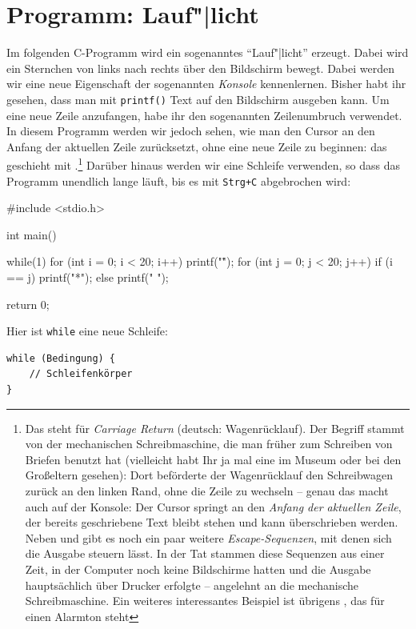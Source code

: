 \section{Programm: Lauf"|licht}
\label{sec:c:lauflicht}

Im folgenden C-Programm wird ein sogenanntes ``Lauf"|licht'' erzeugt. Dabei wird ein Sternchen von links nach rechts über den Bildschirm bewegt. 
Dabei werden wir eine neue Eigenschaft der sogenannten \emph{Konsole} kennenlernen. Bisher habt ihr gesehen, dass man mit \texttt{printf()} Text auf den Bildschirm ausgeben kann. Um eine neue Zeile anzufangen, habe ihr den sogenannten Zeilenumbruch  verwendet. In diesem Programm werden wir jedoch sehen, wie man den Cursor an den Anfang der aktuellen Zeile zurücksetzt, ohne eine neue Zeile zu beginnen: das geschieht mit .\footnote{%
    Das  steht für \emph{Carriage Return} (deutsch: Wagenrücklauf). Der Begriff stammt von der mechanischen Schreibmaschine, die man früher zum Schreiben von Briefen benutzt hat (vielleicht habt Ihr ja mal eine im Museum oder bei den Großeltern gesehen): Dort beförderte der Wagenrücklauf den Schreibwagen zurück an den linken Rand, ohne die Zeile zu wechseln -- genau das macht  auch auf der Konsole: Der Cursor springt an den \emph{Anfang der aktuellen Zeile}, der bereits geschriebene Text bleibt stehen und kann überschrieben werden. Neben  und  gibt es noch ein paar weitere \emph{Escape-Sequenzen}, mit denen sich die Ausgabe steuern lässt. In der Tat stammen diese Sequenzen aus einer Zeit, in der Computer noch keine Bildschirme hatten und die Ausgabe hauptsächlich über Drucker erfolgte -- angelehnt an die mechanische Schreibmaschine. Ein weiteres interessantes Beispiel ist übrigens , das für einen Alarmton steht}
Darüber hinaus werden wir eine Schleife verwenden, so dass das Programm unendlich lange läuft, bis es mit \texttt{Strg+C} abgebrochen wird:

\begin{code}
#include <stdio.h>

int main() {
    while(1) {
        for (int i = 0; i < 20; i++) {
            printf("\r");
            for (int j = 0; j < 20; j++) {
                if (i == j)
                    printf("*");
                else
                    printf(" ");
            }
        }
    }

    return 0;
}
\end{code}
Hier ist \texttt{while} eine neue Schleife:

\begin{verbatim}
while (Bedingung) {
    // Schleifenkörper
}
\end{verbatim}

